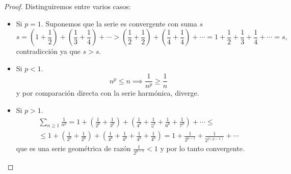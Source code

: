 \begin{proof}
    Distinguiremos entre varios casos:
    \begin{itemize}
        \item Si $p = 1$. Suponemos que la serie es convergente con suma $s$
        \[
            s = \left( 1 + \frac{1}{2} \right) + \left( \frac{1}{3} + \frac{1}{4}
            \right) + \cdots > \left( \frac{1}{2} + \frac{1}{2} \right) + \left(
            \frac{1}{4} + \frac{1}{4} \right) + \cdots =
            1 + \frac{1}{2} + \frac{1}{3} + \frac{1}{4} + \cdots = s,
        \]
        contradicción ya que $s>s$.
        \item Si $p < 1$.
        \[
            n^p \leq n \implies \frac{1}{n^p} \geq \frac{1}{n}
        \]
        y por comparación directa con la serie harmónica, diverge.
        \item Si $p > 1$.
        \begin{gather*}
            \sum_{n \geq 1} \frac{1}{n^p} = 1 + \left(\frac{1}{2^p} + \frac{1}{3^p}
            \right) + \left( \frac{1}{4^p} + \frac{1}{5^p} + \frac{1}{6^p} +
            \frac{1}{7^p} \right) + \cdots \leq \\ \leq 1 + \left(\frac{1}{2^p} +
            \frac{1}{2^p} \right) + \left( \frac{1}{4^p} + \frac{1}{4^p} +
            \frac{1}{4^p} + \frac{1}{4^p} \right) = 1 + \frac{1}{2^{p-1}} +
            \frac{1}{2^{2(p-1)}} + \cdots
        \end{gather*}
        que es una serie geométrica de razón $\frac{1}{2^{p-1}} < 1$ y por lo tanto
        convergente.
    \end{itemize}
\end{proof}

